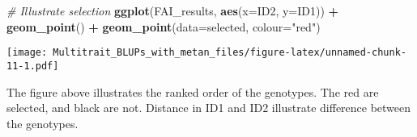 \documentclass[
]{article}
\newenvironment{Shaded}{\begin{snugshade}}{\end{snugshade}}
\newcommand{\AttributeTok}[1]{\textcolor[rgb]{0.13,0.29,0.53}{#1}}
\newcommand{\CommentTok}[1]{\textcolor[rgb]{0.56,0.35,0.01}{\textit{#1}}}
\newcommand{\FunctionTok}[1]{\textcolor[rgb]{0.13,0.29,0.53}{\textbf{#1}}}
\newcommand{\NormalTok}[1]{#1}
\newcommand{\SpecialCharTok}[1]{\textcolor[rgb]{0.81,0.36,0.00}{\textbf{#1}}}
\newcommand{\StringTok}[1]{\textcolor[rgb]{0.31,0.60,0.02}{#1}}
\begin{document}
\begin{Shaded}
\begin{Highlighting}[]
\CommentTok{\# Illustrate selection}
\FunctionTok{ggplot}\NormalTok{(FAI\_results, }\FunctionTok{aes}\NormalTok{(}\AttributeTok{x=}\NormalTok{ID2, }\AttributeTok{y=}\NormalTok{ID1)) }\SpecialCharTok{+} 
  \FunctionTok{geom\_point}\NormalTok{() }\SpecialCharTok{+} 
  \FunctionTok{geom\_point}\NormalTok{(}\AttributeTok{data=}\NormalTok{selected, }\AttributeTok{colour=}\StringTok{"red"}\NormalTok{)}
\end{Highlighting}
\end{Shaded}

\texttt{[image: Multitrait\_BLUPs\_with\_metan\_files/figure-latex/unnamed-chunk-11-1.pdf]}

The figure above illustrates the ranked order of the genotypes. The red
are selected, and black are not. Distance in ID1 and ID2 illustrate
difference between the genotypes.
\end{document}
